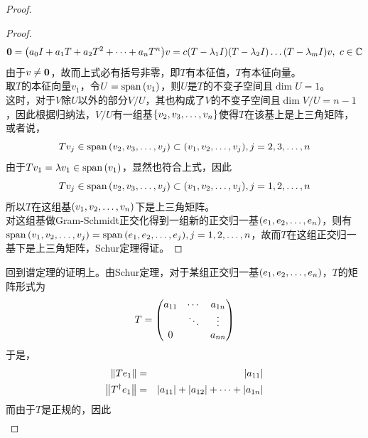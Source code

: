 \documentclass[12pt,a4paper,openany,twoside]{book}
\numberwithin{equation}{section}
\begin{document}
\begin{proof}
\begin{proof}
\begin{equation}
              \vb*{0}=\qty(a_0I+a_1T+a_2T^2+\dots+a_nT^n)v=c\qty(T-\lambda_1I)\qty(T-\lambda_2I)\dots\qty(T-\lambda_mI)v,\ c\in\mathbb{C}
            \end{equation}
            由于$v\neq\vb{0}$，故而上式必有括号非零，即$T$有本征值，$T$有本征向量。\\
            取$T$的本征向量$v_1$，令$U=\operatorname{span}\qty(v_1)$，则$U$是$T$的不变子空间且$\dim U=1$。\\
            这时，对于$V$除$U$以外的部分$V/U$，其也构成了$V$的不变子空间且$\dim V/U=n-1$，因此根据归纳法，$V/U$有一组基$\qty{v_2,v_3,\dots,v_n}$使得$T$在该基上是上三角矩阵，或者说，
            \begin{equation}
              Tv_j\in\operatorname{span}\qty(v_2,v_3,\dots,v_j)\subset\qty(v_1,v_2,\dots,v_j), j=2,3,\dots,n
            \end{equation}
            由于$Tv_1=\lambda v_1\in\operatorname{span}\qty(v_1)$，显然也符合上式，因此
            \begin{equation}
              Tv_j\in\operatorname{span}\qty(v_2,v_3,\dots,v_j)\subset\qty(v_1,v_2,\dots,v_j), j=1,2,\dots,n
            \end{equation}
            所以$T$在这组基$\qty(v_1,v_2,\dots,v_n)$下是上三角矩阵。\\
            对这组基做Gram-Schmidt正交化得到一组新的正交归一基$\qty(e_1,e_2,\dots,e_n)$，则有$\operatorname{span}\qty(v_1,v_2,\dots,v_j)=\operatorname{span}\qty(e_1,e_2,\dots,e_j), j=1,2,\dots,n$，故而$T$在这组正交归一基下是上三角矩阵，Schur定理得证。
          \end{proof}
          回到谱定理的证明上。由Schur定理，对于某组正交归一基$\qty(e_1,e_2,\dots,e_n)$，$T$的矩阵形式为
          \begin{equation}
            T=\mqty(
              a_{11} & \cdots & a_{1n} \\
               & \ddots & \vdots \\
              0 & & a_{nn}
            )
          \end{equation}
          于是，
          \begin{eqnarray}
            \norm{Te_1}&=&\abs{a_{11}}\\
            \norm{T^\dagger e_1}&=&\abs{a_{11}}+\abs{a_{12}}+\dots+\abs{a_{1n}}
          \end{eqnarray}
          而由于$T$是正规的，因此
          \begin{equation}
            \begin{aligned}

\end{aligned}
\end{equation}
\end{proof}
\end{document}
